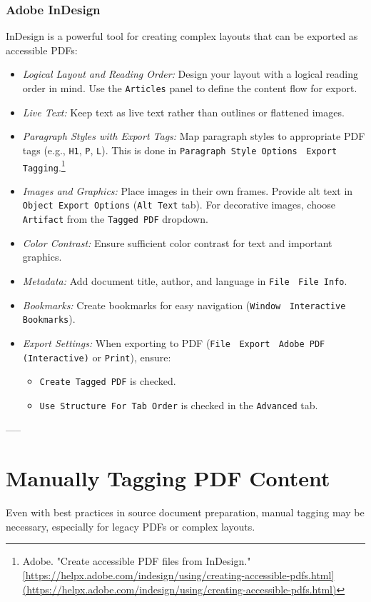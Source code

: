 \begin{itemize}
\subsubsection{Adobe InDesign}
\label{subsubsec:indesign}
InDesign is a powerful tool for creating complex layouts that can be exported as accessible PDFs:
\begin{itemize}
\item \emph{Logical Layout and Reading Order:} Design your layout with a logical reading order in mind. Use the \texttt{Articles} panel to define the content flow for export.
\item \emph{Live Text:} Keep text as live text rather than outlines or flattened images.
\item \emph{Paragraph Styles with Export Tags:} Map paragraph styles to appropriate PDF tags (e.g., \texttt{H1}, \texttt{P}, \texttt{L}). This is done in \texttt{Paragraph Style Options} $\>$ \texttt{Export Tagging}.\footnote{Adobe. "Create accessible PDF files from InDesign." \url{[https://helpx.adobe.com/indesign/using/creating-accessible-pdfs.html](https://helpx.adobe.com/indesign/using/creating-accessible-pdfs.html)}}
\item \emph{Images and Graphics:} Place images in their own frames. Provide alt text in \texttt{Object Export Options} (\texttt{Alt Text} tab). For decorative images, choose \texttt{Artifact} from the \texttt{Tagged PDF} dropdown.
\item \emph{Color Contrast:} Ensure sufficient color contrast for text and important graphics.
\item \emph{Metadata:} Add document title, author, and language in \texttt{File} $\>$ \texttt{File Info}.
\item \emph{Bookmarks:} Create bookmarks for easy navigation (\texttt{Window} $\>$ \texttt{Interactive} $\>$ \texttt{Bookmarks}).
\item \emph{Export Settings:} When exporting to PDF (\texttt{File} $\>$ \texttt{Export} $\>$ \texttt{Adobe PDF (Interactive)} or \texttt{Print}), ensure:
\begin{itemize}
\item \texttt{Create Tagged PDF} is checked.
\item \texttt{Use Structure For Tab Order} is checked in the \texttt{Advanced} tab.
\end{itemize}
\end{itemize}

-----

\section{Manually Tagging PDF Content}
\label{sec:manual-tagging}
Even with best practices in source document preparation, manual tagging may be necessary, especially for legacy PDFs or complex layouts.


\end{itemize}

